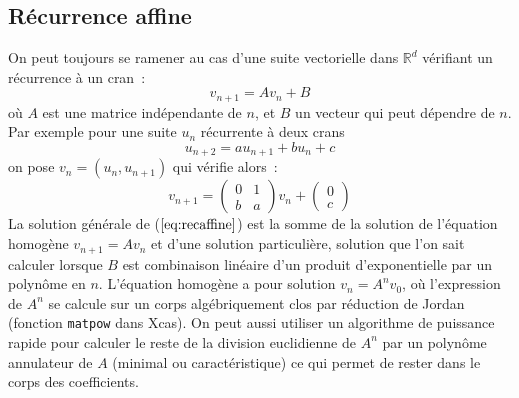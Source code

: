 \documentclass[a4paper,11pt]{book}
\begin{document}
\begin{giacjshere}
\subsection{Récurrence affine}
On peut toujours se ramener au cas d'une suite vectorielle dans $\mathbb{R}^d$
vérifiant un récurrence à un cran~:
\begin{equation} v_{n+1} = A v_n + B \label{eq:recaffine}
\end{equation}
où $A$ est une matrice indépendante de $n$, et $B$ un vecteur qui peut
dépendre de $n$.
Par exemple pour une suite $u_n$ récurrente à deux crans
\[ u_{n+2}=au_{n+1}+bu_n+c\]
on pose $v_n=(u_n,u_{n+1})$ qui vérifie alors~:
\[ v_{n+1}= \left( \begin{array}{cc} 0 & 1 \\ b & a \end{array}\right) v_n + 
\left( \begin{array}{c}0 \\ c\end{array}\right)\] 
La solution générale de (\(\ref{eq:recaffine}\)) est la somme de la solution
de l'équation homogène $v_{n+1}=Av_n$ et d'une solution particulière,
solution que l'on sait calculer lorsque $B$ est combinaison linéaire
d'un produit d'exponentielle par un polynôme en $n$.
L'équation homogène a pour solution $v_n=A^n v_0$, où l'expression de $A^n$
se calcule sur un corps algébriquement clos par réduction de Jordan
(fonction \verb|matpow| dans Xcas). On peut aussi utiliser un algorithme
de puissance rapide pour calculer le reste de la division euclidienne
de $A^n$ par un polynôme annulateur de $A$ (minimal ou caractéristique)
ce qui permet de rester dans le corps des coefficients.


\end{giacjshere}
\end{document}
